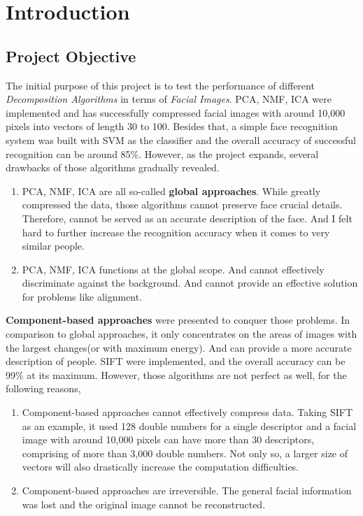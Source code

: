 \chapter{Introduction}

\section{Project Objective}
The initial purpose of this project is to test the performance of different \textit{Decomposition Algorithms} in terms of \textit{Facial Images}. PCA, NMF, ICA were implemented and has successfully compressed facial images with around 10,000 pixels into vectors of length 30 to 100. Besides that, a simple face recognition system was built with SVM as the classifier and the overall accuracy of successful recognition can be around 85\%. However, as the project expands, several drawbacks of those algorithms gradually revealed. 
\begin{enumerate}
    \item PCA, NMF, ICA are all so-called \textbf{global approaches}. While greatly compressed the data, those algorithms cannot preserve face crucial details. Therefore, cannot be served as an accurate description of the face. And I felt hard to further increase the recognition accuracy when it comes to very similar people.
    \item PCA, NMF, ICA functions at the global scope. And cannot effectively discriminate against the background. And cannot provide an effective solution for problems like alignment.
\end{enumerate}

\textbf{Component-based approaches} were presented to conquer those problems. In comparison to global 
approaches, it only concentrates on the areas of images with the largest changes(or with maximum energy). And can provide a more accurate description of people. SIFT were implemented, and the overall accuracy can be 99\% at its maximum. However, those algorithms are not perfect as well, for the following reasons,
\begin{enumerate}
    \item Component-based approaches cannot effectively compress data. Taking SIFT as an example, it used 128 double numbers for a single descriptor and a facial image with around 10,000 pixels can have more than 30 descriptors, comprising of more than 3,000 double numbers. Not only so, a larger size of vectors will also drastically increase the computation difficulties.
    \item Component-based approaches are irreversible. The general facial information was lost and the original image cannot be reconstructed.
\end{enumerate}


